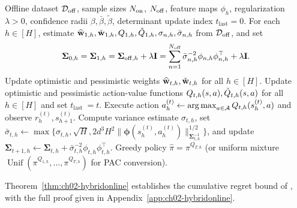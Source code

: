 \begin{algorithm}[htbp]
    \caption{Offline-to-Online Hybrid RL via Variance-Weighted Optimistic Value Iteration}
    \label{alg:ch02-alg3}
    \begin{algorithmic}[1]
         Offline dataset $\gD_{\off}$, sample sizes $N_{\on}$, $N_{\off}$, feature maps $\phi_h$, regularization $\lambda>0$, confidence radii $\beta, \bar\beta, \tilde\beta$, determinant update index $t_{\text{last}}=0$.
         For each $h \in [H]$, estimate $\widehat{\mathbf{w}}_{1, h}, \widecheck{\mathbf{w}}_{1, h}, Q_{1,h}, \widecheck{Q}_{1,h}, \sigma_{n,h}, \bar{\sigma}_{n,h}$ from $\gD_{\off}$, and set
        \begin{equation*}
            \boldsymbol{\Sigma}_{0, h}=\boldsymbol{\Sigma}_{1, h}=\boldsymbol{\Sigma}_{\off, h} + \lambda\mathbf{I} = \sum_{n=1}^{N_{\off}}\bar{\sigma}_{n,h}^{-2}\phi_{n,h}\phi_{n,h}^{\top}+\lambda\mathbf{I}.
        \end{equation*}
            \State Update optimistic and pessimistic weights $\widehat{\mathbf{w}}_{t, h}, \widecheck{\mathbf{w}}_{t, h}$ for all $h \in [H]$.
                \State Update optimistic and pessimistic action-value functions $Q_{t, h}(s, a), \widecheck{Q}_{t, h}(s, a)$ for all $h \in [H]$ and set $t_{\text {last }}=t$.
            \EndIf
                \State Execute action $a_h^{(t)} \leftarrow \argmax_{a \in \gA} Q_{t,h}(s_h^{(t)}, a)$ and observe $r_h^{(t)}, s_{h+1}^{(t)}$.
                \State Compute variance estimate $\sigma_{t, h}$, set ${\bar{\sigma}}_{t, h} \leftarrow \max \{\sigma_{t, h}, \sqrt{H}, 2 d^3 H^2\|\boldsymbol{\phi}(s_h^{(t)}, a_h^{(t)})\|_{\boldsymbol{\Sigma}_{t, h}^{-1}}^{1 / 2}\}$, and update $\boldsymbol{\Sigma}_{t+1, h} \leftarrow \boldsymbol{\Sigma}_{t, h} + \bar{\sigma}_{t, h}^{-2}\phi_{t,h}\phi_{t,h}^\top$.
            \EndFor
        \EndFor
         Greedy policy $\widehat{\pi} = \pi^{Q_{T,h}}$ (or uniform mixture $\operatorname{Unif}(\pi^{Q_{1,h}},\dots,\pi^{Q_{T,h}})$ for PAC conversion).
    \end{algorithmic}
\end{algorithm}

Theorem~\ref{thm:ch02-hybridonline} establishes the cumulative regret bound of , with the full proof given in Appendix~\ref{app:ch02-hybridonline}.

